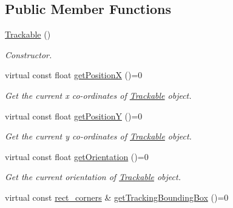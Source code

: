 \subsection*{Public Member Functions}
\begin{DoxyCompactItemize}
\item 
\hypertarget{class_trackable_aa95786c1de337603ffe42e74cef944e0}{\hyperlink{class_trackable_aa95786c1de337603ffe42e74cef944e0}{Trackable} ()}\label{class_trackable_aa95786c1de337603ffe42e74cef944e0}

\begin{DoxyCompactList}\small\item\em Constructor. \end{DoxyCompactList}\item 
\hypertarget{class_trackable_ab167af97aef9656403ee2d28adaf3149}{virtual const float \hyperlink{class_trackable_ab167af97aef9656403ee2d28adaf3149}{get\+Position\+X} ()=0}\label{class_trackable_ab167af97aef9656403ee2d28adaf3149}

\begin{DoxyCompactList}\small\item\em Get the current x co-\/ordinates of \hyperlink{class_trackable}{Trackable} object. \end{DoxyCompactList}\item 
\hypertarget{class_trackable_add27867f4ebf30f1fe7c3f94b4d7f4d5}{virtual const float \hyperlink{class_trackable_add27867f4ebf30f1fe7c3f94b4d7f4d5}{get\+Position\+Y} ()=0}\label{class_trackable_add27867f4ebf30f1fe7c3f94b4d7f4d5}

\begin{DoxyCompactList}\small\item\em Get the current y co-\/ordinates of \hyperlink{class_trackable}{Trackable} object. \end{DoxyCompactList}\item 
\hypertarget{class_trackable_afc6b5126b82395a5155cfe76250f92dd}{virtual const float \hyperlink{class_trackable_afc6b5126b82395a5155cfe76250f92dd}{get\+Orientation} ()=0}\label{class_trackable_afc6b5126b82395a5155cfe76250f92dd}

\begin{DoxyCompactList}\small\item\em Get the current orientation of \hyperlink{class_trackable}{Trackable} object. \end{DoxyCompactList}\item 
\hypertarget{class_trackable_a79826040547e1ca65775223f26c37648}{virtual const \hyperlink{structrect__corners}{rect\+\_\+corners} \& \hyperlink{class_trackable_a79826040547e1ca65775223f26c37648}{get\+Tracking\+Bounding\+Box} ()=0}\label{class_trackable_a79826040547e1ca65775223f26c37648}


\end{DoxyCompactItemize}
